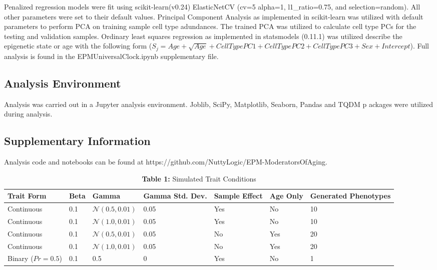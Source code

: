 \documentclass{article}
\begin{document}
{\begin{linenumbers}
Penalized regression models were fit using scikit-learn(v0.24)\cite{Pedregosa2011-fi} 
ElasticNetCV (cv=5 alpha=1, l1\_ratio=0.75, and selection=random). All other parameters were set to their 
default values. Principal Component Analysis as implemented in scikit-learn was utilized with default parameters 
to perform PCA on training sample cell type adundances. The trained PCA was utilized to calculate cell type PCs 
for the testing and validation samples. Ordinary least squares regression as implemented in statsmodels 
(0.11.1)\cite{Seabold2010-lt} was utilized describe the epigenetic state or age with the following 
form ($S_j  = Age + \sqrt{Age} + Cell Type PC1 + Cell Type PC2 + Cell Type PC3 + Sex + Intercept$). 
Full analysis is found in the EPMUniversalClock.ipynb supplementary file. 

\subsection{Analysis Environment}

Analysis was carried out in a Jupyter\cite{Basu_undated-vq} analysis environment.
 Joblib\cite{Varoquaux2009-al}, SciPy\cite{Virtanen2020-wt}, Matplotlib\cite{Hunter2007-nq}, 
 Seaborn\cite{Waskom2021-gj}, Pandas\cite{McKinney2012-ta} and TQDM\cite{Da_Costa-Luis2019-lr} p
 ackages were utilized during analysis. 

\subsection{Supplementary Information}

Analysis code and notebooks can be found at https://github.com/NuttyLogic/EPM-ModeratorsOfAging.

\end{linenumbers}
\printbibliography



\begin{table}[H]
\caption*{\textbf{Table 1:} Simulated Trait Conditions}  
\begin{tabular}{| p{20mm} | p{15mm} | p{20mm} | p{20mm} | p{20mm} | p{20mm} | p{20mm} |}
\hline
\textbf{Trait Form}&\textbf{Beta}&\textbf{Gamma}&\textbf{Gamma Std. Dev.}&\textbf{Sample Effect}&
\textbf{Age Only}&\textbf{Generated Phenotypes}\\ \hline
Continuous&0.1&$\mathcal{N}(0.5, 0.01)$&0.05&Yes&No&10\\ \hline
Continuous&0.1&$\mathcal{N}(1.0, 0.01)$&0.05&Yes&No&10\\ \hline
Continuous&0.1&$\mathcal{N}(0.5, 0.01)$&0.05&No&Yes&20\\ \hline
Continuous&0.1&$\mathcal{N}(1.0, 0.01)$&0.05&No&Yes&20\\ \hline
Binary ($Pr=0.5$)&0.1&0.5&0&Yes&No&1\\ \hline
\end{tabular}
\end{table}

}
\end{document}
